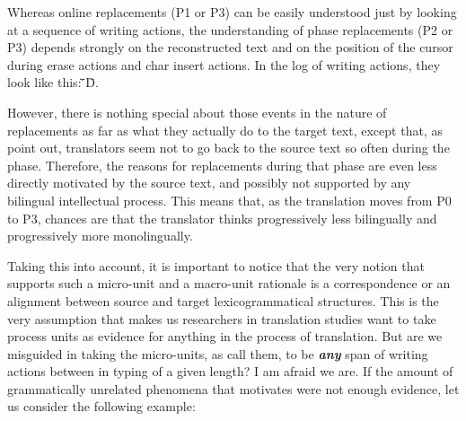 \documentclass[output=paper]{LSP/langsci}
\begin{document}
Whereas online replacements (P1 or P3) can be easily understood just by looking at a sequence of writing actions, the understanding of  phase replacements (P2 or P3) depends strongly on the reconstructed text and on the position of the cursor during erase actions and char insert actions. In the log of writing actions, they look like this: \={ }\uettl\={ }\uettl\u{ }D\={ }.

However, there is nothing special about those events in the nature of replacements as far as what they actually do to the target text, except that, as \citet{Alves:2011vj} point out, translators seem not to go back to the source text so often during the  phase. Therefore, the reasons for replacements during that phase are even less directly motivated by the source text, and possibly not supported by any bilingual intellectual process. This means that, as the translation moves from P0 to P3, chances are that the translator thinks progressively less bilingually and progressively more monolingually.

\largerpage[-1]
Taking this into account, it is important to notice that the very notion that supports such a micro-unit and a macro-unit rationale is a correspondence or an alignment between source and target lexicogrammatical structures. This is the very assumption that makes us researchers in translation studies want to take process units as evidence for anything in the process of translation. But are we misguided in taking the micro-units, as \citet{Alves:2009js,Alves:2011vj} call them, to be \textbf{\textit{any}} span of writing actions between  in typing of a given length? I am afraid we are. If the amount of grammatically unrelated phenomena that motivates  were not enough evidence, let us consider the following example:

\end{document}
